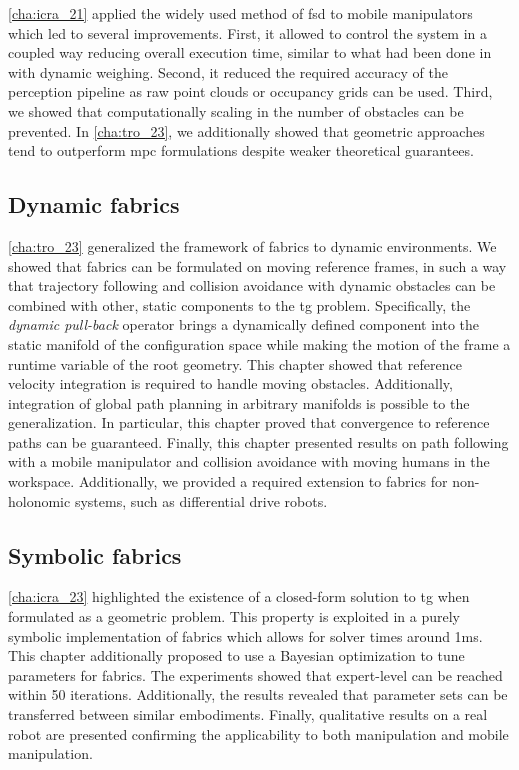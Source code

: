\cref{cha:icra_21} applied the widely used method of \ac{fsd} to mobile
manipulators which led to several improvements. First, it allowed to control
the system in a coupled way reducing overall execution time, similar to what had
been done in \cite{Avanzini2018} with dynamic weighing. Second, it reduced the
required accuracy of the perception pipeline as raw point clouds or occupancy
grids can be used. Third, we showed that computationally scaling in the number
of obstacles can be prevented. In \cref{cha:tro_23},
we additionally showed that geometric approaches tend to outperform \ac{mpc}
formulations despite weaker theoretical guarantees.

\subsection{Dynamic fabrics}
\label{sec:conclusion_dynamic_fabrics}

\cref{cha:tro_23} generalized the framework of \ac{fabrics} to dynamic
environments. We showed that \ac{fabrics} can be formulated on moving reference
frames, in such a way that trajectory following and collision avoidance with
dynamic obstacles can be combined with other, static components to the \ac{tg}
problem. Specifically, the \textit{dynamic pull-back}
operator brings a dynamically defined component into the static manifold of the
configuration space while making the motion of the frame a runtime variable of
the root geometry. This chapter showed that reference velocity integration is
required to handle moving obstacles. Additionally, integration of global path
planning in arbitrary manifolds is possible to the generalization. In
particular, this chapter proved that convergence to reference paths can be 
guaranteed. Finally, this chapter presented results on path following with a
mobile manipulator and collision avoidance with moving humans in the workspace.
Additionally, we provided a required extension to
\ac{fabrics} for non-holonomic systems, such as differential
drive robots.

\subsection{Symbolic fabrics}
\label{sec:conclusion_symbolic_fabrics}

\cref{cha:icra_23} highlighted the existence of a
closed-form solution to \ac{tg} when formulated as a geometric problem.
This property is exploited in a purely symbolic implementation of \ac{fabrics}
which allows for solver times around 1ms. This chapter additionally
proposed to use a Bayesian optimization to tune parameters
for \ac{fabrics}.
The experiments showed that expert-level can be reached within 50 iterations.
Additionally, the results revealed that parameter sets can be transferred between
similar embodiments. Finally, qualitative results on a real robot are presented
confirming the applicability to both manipulation and mobile
manipulation.

